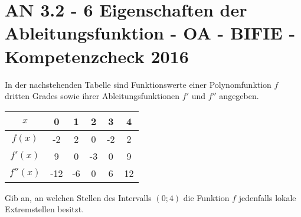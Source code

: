 \section{AN 3.2 - 6 Eigenschaften der Ableitungsfunktion - OA - BIFIE - Kompetenzcheck 2016}

\begin{beispiel}[AN 3.2]{1} %
				In der nachstehenden Tabelle sind Funktionswerte einer Polynomfunktion $f$ dritten Grades sowie ihrer Ableitungsfunktionen $f'$ und $f''$ angegeben.

\begin{center}
\begin{tabular}{|c|c|c|c|c|c|}\hline
$x$&0&1&2&3&4\\ \hline
$f(x)$&-2&2&0&-2&2\\ \hline
$f'(x)$&9&0&-3&0&9\\ \hline
$f''(x)$&-12&-6&0&6&12\\ \hline
\end{tabular}

\end{center}
Gib an, an welchen Stellen des Intervalls $\left(0;4\right)$ die Funktion $f$ jedenfalls lokale Extremstellen besitzt.


\end{beispiel}	